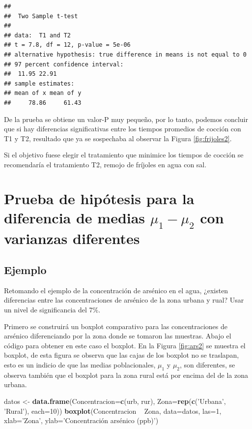 \documentclass[10pt,]{krantz}
\makeatletter
\newenvironment{Shaded}{\begin{snugshade}}{\end{snugshade}}
\newcommand{\KeywordTok}[1]{\textcolor[rgb]{0.13,0.29,0.53}{\textbf{{#1}}}}
\newcommand{\DataTypeTok}[1]{\textcolor[rgb]{0.13,0.29,0.53}{{#1}}}
\newcommand{\DecValTok}[1]{\textcolor[rgb]{0.00,0.00,0.81}{{#1}}}
\newcommand{\StringTok}[1]{\textcolor[rgb]{0.31,0.60,0.02}{{#1}}}
\newcommand{\NormalTok}[1]{{#1}}
\newenvironment{kframe}{%
\medskip{}
\setlength{\fboxsep}{.8em}
 \def\at@end@of@kframe{}%
 \ifinner\ifhmode%
  \def\at@end@of@kframe{\end{minipage}}%
  \begin{minipage}{\columnwidth}%
 \fi\fi%
 \def\FrameCommand##1{\hskip\@totalleftmargin \hskip-\fboxsep
 \colorbox{shadecolor}{##1}\hskip-\fboxsep
     \hskip-\linewidth \hskip-\@totalleftmargin \hskip\columnwidth}%
 \MakeFramed {\advance\hsize-\width
   \@totalleftmargin\z@ \linewidth\hsize
   \@setminipage}}%
 {\par\unskip\endMakeFramed%
 \at@end@of@kframe}
\renewenvironment{Shaded}{\begin{kframe}}{\end{kframe}}
\makeatother
\begin{document}
\begin{verbatim}
## 
##  Two Sample t-test
## 
## data:  T1 and T2
## t = 7.8, df = 12, p-value = 5e-06
## alternative hypothesis: true difference in means is not equal to 0
## 97 percent confidence interval:
##  11.95 22.91
## sample estimates:
## mean of x mean of y 
##     78.86     61.43
\end{verbatim}

De la prueba se obtiene un valor-P muy pequeño, por lo tanto, podemos
concluir que si hay diferencias significativas entre los tiempos
promedios de cocción con T1 y T2, resultado que ya se sospechaba al
observar la Figura \ref{fig:frijoles2}.

Si el objetivo fuese elegir el tratamiento que minimice los tiempos de
cocción se recomendaría el tratamiento T2, remojo de fríjoles en agua
con sal.

\section{\texorpdfstring{Prueba de hipótesis para la diferencia de
medias \(\mu_1-\mu_2\) con varianzas
diferentes}{Prueba de hipótesis para la diferencia de medias \textbackslash{}mu\_1-\textbackslash{}mu\_2 con varianzas diferentes}}\label{prueba-de-hipotesis-para-la-diferencia-de-medias-mu_1-mu_2-con-varianzas-diferentes}

\subsection*{Ejemplo}\label{ejemplo-68}


Retomando el ejemplo de la concentración de arsénico en el agua,
¿existen diferencias entre las concentraciones de arsénico de la zona
urbana y rual? Usar un nivel de significancia del 7\%.

Primero se construirá un boxplot comparativo para las concentraciones de
arsénico diferenciando por la zona donde se tomaron las muestras. Abajo
el código para obtener en este caso el boxplot. En la Figura
\ref{fig:ars2} se muestra el boxplot, de esta figura se observa que las
cajas de los boxplot no se traslapan, esto es un indicio de que las
medias poblacionales, \(\mu_1\) y \(\mu_2\), son diferentes, se observa
también que el boxplot para la zona rural está por encima del de la zona
urbana.

\begin{Shaded}
\begin{Highlighting}[]
\NormalTok{datos <-}\StringTok{ }\KeywordTok{data.frame}\NormalTok{(}\DataTypeTok{Concentracion=}\KeywordTok{c}\NormalTok{(urb, rur),}
                    \DataTypeTok{Zona=}\KeywordTok{rep}\NormalTok{(}\KeywordTok{c}\NormalTok{(}\StringTok{'Urbana'}\NormalTok{, }\StringTok{'Rural'}\NormalTok{), }\DataTypeTok{each=}\DecValTok{10}\NormalTok{))}
\KeywordTok{boxplot}\NormalTok{(Concentracion ~}\StringTok{ }\NormalTok{Zona, }\DataTypeTok{data=}\NormalTok{datos, }\DataTypeTok{las=}\DecValTok{1}\NormalTok{,}
        \DataTypeTok{xlab=}\StringTok{'Zona'}\NormalTok{, }\DataTypeTok{ylab=}\StringTok{'Concentración arsénico (ppb)'}\NormalTok{)}
\end{Highlighting}
\end{Shaded}
\end{document}

